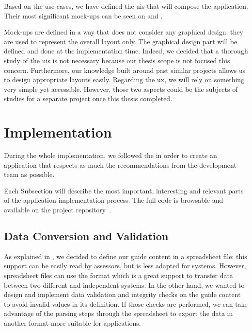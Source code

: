 Based on the use cases, we have defined the \glspl{ui} that will compose the application. Their most significant mock-ups can be seen on  and .

Mock-ups are defined in a way that does not consider any graphical design: they are used to represent the overall layout only. The graphical design part will be defined and done at the implementation time. Indeed, we decided that a thorough study of the \glspl{ui} is not necessary because our thesis scope is not focused  this concern. Furthermore, our knowledge built around past similar projects allows us to design appropriate layouts easily. Regarding the \gls{ux}, we will rely on something very simple yet accessible. However, those two aspects could be the subjects of studies for a separate project once this thesis completed.




\section{Implementation}
\label{sec:app_implementation}

During the whole implementation, we followed the  in order to create an application that respects as much the recommendations from the development team as possible.

Each Subsection will describe the most important, interesting and relevant parts of the application implementation process. The full code is browsable and available on the project repository~\cite{mt-forge}.

\subsection{Data Conversion and Validation}
\label{subsec:app_implementation_data}

As explained in , we decided to define our guide content in a spreadsheet file: this support can be easily read by assessors, but is less adapted for systems. However, spreadsheet files can use the  format which is a great support to transfer data between two different and independent systems. In the other hand, we wanted to design and implement data validation and integrity checks on the guide content to avoid invalid values in its definition. If those checks are performed, we can take advantage of the parsing steps through the spreadsheet to export the data in another format more suitable for applications.

